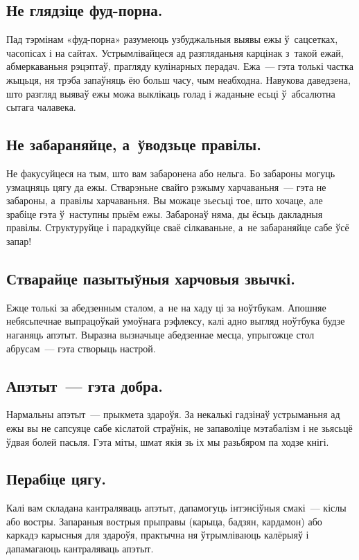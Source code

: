 \subsection{Не глядзіце фуд-порна.}
Пад тэрмінам «фуд-порна» разумеюць узбуджальныя выявы ежы ў~сацсетках, часопісах і на сайтах. Устрымлівайцеся ад разгляданьня карцінак з~такой ежай, абмеркаваньня рэцэптаў, прагляду кулінарных перадач. Ежа~--- гэта толькі частка жыцьця, ня трэба запаўняць ёю больш часу, чым неабходна. Навукова даведзена, што разгляд выяваў ежы можа выклікаць голад і жаданьне есьці ў~абсалютна сытага чалавека.


\subsection{Не забараняйце, а~ўводзьце правілы.}
Не факусуйцеся на тым, што вам забаронена або нельга. Бо забароны могуць узмацняць цягу да ежы. Стварэньне свайго рэжыму харчаваньня~--- гэта не забароны, а~правілы харчаваньня. Вы можаце зьесьці тое, што хочаце, але зрабіце гэта ў~наступны прыём ежы. Забаронаў няма, ды ёсьць дакладныя правілы. Структуруйце і парадкуйце сваё сілкаваньне, а~не забараняйце сабе ўсё запар!

\subsection{Стварайце пазытыўныя харчовыя звычкі.}
Ежце толькі за абедзенным сталом, а~не на хаду ці за ноўтбукам. Апошняе небясьпечнае выпрацоўкай умоўнага рэфлексу, калі адно выгляд ноўтбука будзе наганяць апэтыт. Выразна вызначыце абедзеннае месца, упрыгожце стол абрусам~--- гэта створыць настрой.

\subsection{Апэтыт~--- гэта добра.}
Нармальны апэтыт~--- прыкмета здароўя. За некалькі гадзінаў устрыманьня ад ежы вы не сапсуяце сабе кіслатой страўнік, не запаволіце мэтабалізм і не зьясьцё ўдвая болей пасьля. Гэта міты, шмат якія зь іх мы разьбяром па ходзе кнігі.

\subsection{Перабіце цягу.}
Калі вам складана кантраляваць апэтыт, дапамогуць інтэнсіўныя смакі~--- кіслы або востры. Запараныя вострыя прыправы (карыца, бадзян, кардамон) або каркадэ карысныя для здароўя, практычна ня ўтрымліваюць калёрыяў і дапамагаюць кантраляваць апэтыт.

